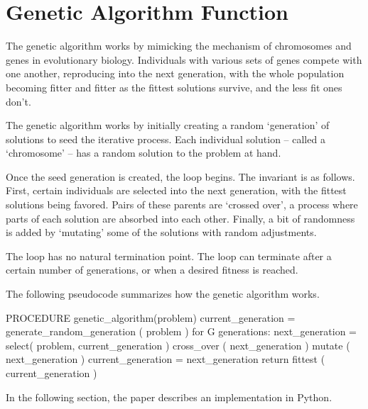 \section{Genetic Algorithm Function}

The genetic algorithm works by mimicking the mechanism of chromosomes and genes in evolutionary biology. Individuals with various sets of genes compete with one another, reproducing into the next generation, with the whole population becoming fitter and fitter as the fittest solutions survive, and the less fit ones don't.

The genetic algorithm works by initially creating a random `generation' of solutions to seed the iterative process. Each individual solution -- called a `chromosome' -- has a random solution to the problem at hand.  

Once the seed generation is created, the loop begins. The invariant is as follows. First, certain individuals are selected into the next generation, with the fittest solutions being favored. Pairs of these parents are `crossed over', a process where parts of each solution are absorbed into each other. Finally, a bit of randomness is added by `mutating' some of the solutions with random adjustments. 

The loop has no natural termination point. The loop can terminate after a certain number of generations, or when a desired fitness is reached. 

The following pseudocode summarizes how the genetic algorithm works. 

\begin{python}
PROCEDURE genetic_algorithm(problem)
	current_generation = generate_random_generation ( problem )   
	for G generations:                                 
	    next_generation = select( problem, current_generation )    
	    cross_over ( next_generation )	                   
	    mutate ( next_generation )                   
	    current_generation = next_generation
	return fittest ( current_generation )           



\end{python}

In the following section, the paper describes an implementation in Python.